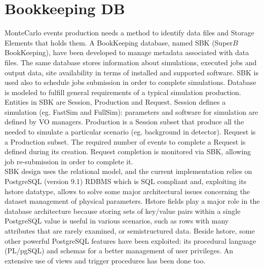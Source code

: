 \documentclass[a4paper]{jpconf}
\begin{document}
\section{Bookkeeping DB}
\label{sec:sbk}

MonteCarlo events production needs a method to identify data files and Storage Elements that holds them. 
A BookKeeping database, named SBK (Super$B$ BookKeeping), have been developed to manage metadata associated with data files. The same database stores information about simulations, executed jobs and output data, site availability in terms of installed and supported software. SBK is used also to schedule jobs submission in order to complete simulations. Database is modeled to fulfill general requirements of a typical simulation production.\\
Entities in SBK are Session, Production and Request.%
Session defines a simulation (eg. FastSim and FullSim): parameters and software for simulation are defined by VO managers. Production is a Session subset that produce all the  needed to simulate a particular scenario (eg. background in detector).
Request is a Production subset. The required number of events to complete a Request is defined during its creation. Request completion is monitored via SBK, allowing job re-submission in order to complete it.\\
SBK design uses the relational model, and the current implementation relies on PostgreSQL (version 9.1) RDBMS which is SQL compliant and, exploiting its hstore datatype, allows to solve some major architectural issues concerning the dataset management of physical parameters. Hstore fields play a major role in the database architecture because storing sets of key/value pairs within a single PostgreSQL value is useful in various scenarios, such as rows with many attributes that are rarely examined, or semistructured data. Beside hstore, some other powerful PostgreSQL features have been exploited: its procedural language (PL/pgSQL) and schemas for a better management of user privileges. An extensive use of views and trigger procedures has been done too.

\end{document}
